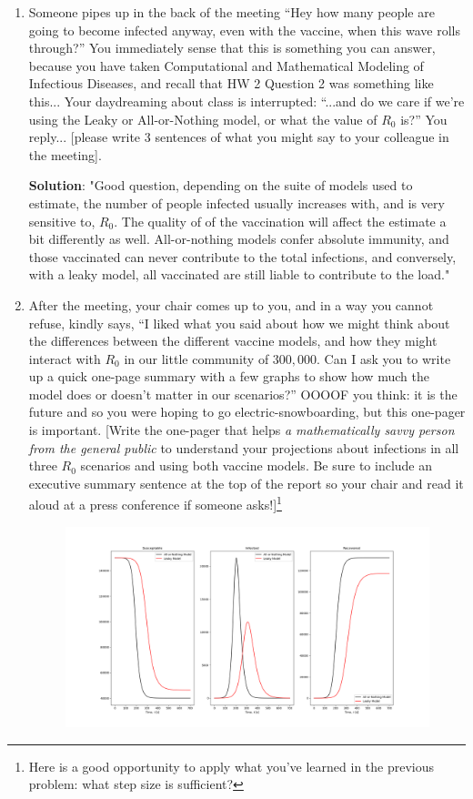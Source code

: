 \documentclass[11pt]{article}
\begin{document}
\begin{enumerate}
\begin{enumerate}[label=\alph*.]
\begin{tcolorbox}
	\end{tcolorbox}
	\item Someone pipes up in the back of the meeting ``Hey how many people are going to become infected anyway, even with the vaccine, when this wave rolls through?'' You immediately sense that this is something you can answer, because you have taken Computational and Mathematical Modeling of Infectious Diseases, and recall that HW 2 Question 2 was something like this... Your daydreaming about class is interrupted: ``...and do we care if we're using the Leaky or All-or-Nothing model, or what the value of $R_0$ is?'' You reply... [please write 3 sentences of what you might say to your colleague in the meeting].
	\begin{tcolorbox}
		\textbf{Solution}: 
		"Good question, depending on the suite of models used to estimate, the number of people infected usually increases with, and is very sensitive to, $R_0$. The quality of of the vaccination will affect the estimate a bit differently as well. All-or-nothing models confer absolute immunity, and those vaccinated can never contribute to the total infections, and conversely, with a leaky model, all vaccinated are still liable to contribute to the load."
	\end{tcolorbox}
	\item After the meeting, your chair comes up to you, and in a way you cannot refuse, kindly says, ``I liked what you said about how we might think about the differences between the different vaccine models, and how they might interact with $R_0$ in our little community of $300,000$. Can I ask you to write up a quick one-page summary with a few graphs to show how much the model does or doesn't matter in our scenarios?''  OOOOF you think: it is the future and so you were hoping to go electric-snowboarding, but this one-pager is important. [Write the one-pager that helps {\it a mathematically savvy person from the general public} to understand your projections about infections in all three $R_0$ scenarios and using both vaccine models. Be sure to include an executive summary sentence at the top of the report so your chair and read it aloud at a press conference if someone asks!]\footnote{Here is a good opportunity to apply what you've learned in the previous problem: what step size is sufficient?}
		\begin{figure}
		\centering
		\includegraphics[scale=0.4]{R03.png}

\end{figure}
\end{enumerate}
\end{enumerate}
\end{document}
